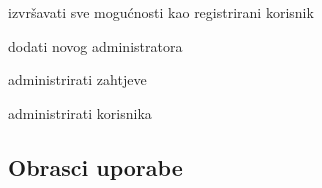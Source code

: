 \begin{packed_enum}
\begin{packed_enum}
				\end{packed_enum}
				\item  {}
				\begin{packed_enum}
					\item izvršavati sve mogućnosti kao registrirani korisnik
					\item dodati novog administratora	
					\item administrirati zahtjeve
					\item administrirati korisnika
				\end{packed_enum}
			\end{packed_enum}
			
			\eject 
			
			
				
			\subsection{Obrasci uporabe}
				
				
